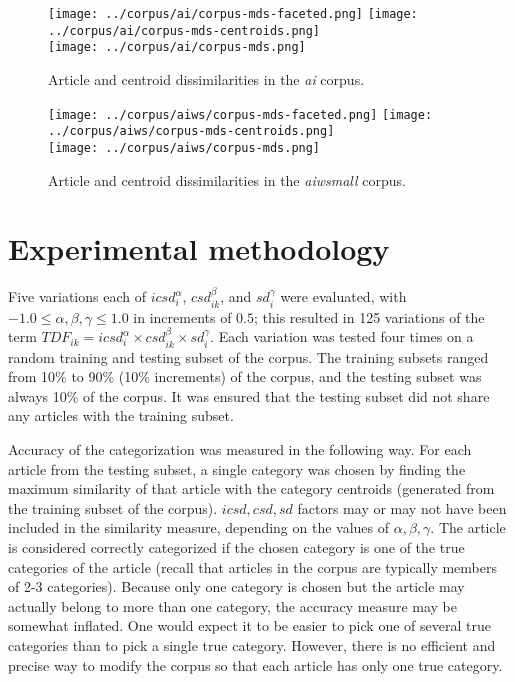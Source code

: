 \documentclass{article}
\begin{document}
\begin{figure}
\begin{center}
\texttt{[image: ../corpus/ai/corpus-mds-faceted.png]}
\texttt{[image: ../corpus/ai/corpus-mds-centroids.png]}\\
\texttt{[image: ../corpus/ai/corpus-mds.png]}
\caption{Article and centroid dissimilarities in the \textit{ai} corpus.}

\label{fig:mds-nowhite}
\end{center}
\end{figure}

\begin{figure}
\begin{center}
\texttt{[image: ../corpus/aiws/corpus-mds-faceted.png]}
\texttt{[image: ../corpus/aiws/corpus-mds-centroids.png]}\\
\texttt{[image: ../corpus/aiws/corpus-mds.png]}
\caption{Article and centroid dissimilarities in the \textit{aiwsmall} corpus.}

\label{fig:mds-whitesmall}
\end{center}
\end{figure}

\section{Experimental methodology}

Five variations each of $icsd_i^{\alpha}$, $csd_{ik}^{\beta}$, and
$sd_i^{\gamma}$ were evaluated, with $- 1.0 \leq \alpha, \beta, \gamma \leq
1.0$ in increments of $0.5$; this resulted in 125 variations of the term
$TDF_{ik}=icsd_i^\alpha \times csd_{ik}^\beta \times sd_i^\gamma$. Each
variation was tested four times on a random training and testing subset of the
corpus. The training subsets ranged from 10\% to 90\% (10\% increments) of the
corpus, and the testing subset was always 10\% of the corpus. It was ensured
that the testing subset did not share any articles with the training subset.

Accuracy of the categorization was measured in the following way. For each
article from the testing subset, a single category was chosen by finding the
maximum similarity of that article with the category centroids (generated from
the training subset of the corpus). $icsd,csd,sd$ factors may or may not have
been included in the similarity measure, depending on the values of
$\alpha,\beta,\gamma$. The article is considered correctly categorized if the
chosen category is one of the true categories of the article (recall that
articles in the corpus are typically members of 2-3 categories). Because only
one category is chosen but the article may actually belong to more than one
category, the accuracy measure may be somewhat inflated. One would expect it to
be easier to pick one of several true categories than to pick a single true
category. However, there is no efficient and precise way to modify the corpus
so that each article has only one true category.
\end{document}
